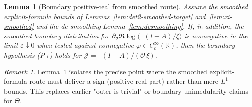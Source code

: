 \documentclass[11pt]{article}
\newtheorem{lemma}[theorem]{Lemma}
\theoremstyle{definition}
\theoremstyle{remark}
\newtheorem{remark}[theorem]{Remark}
\newcommand{\R}{\mathbb{R}}
\DeclareMathOperator{\dettwo}{det_2}
\begin{document}
\begin{lemma}[Boundary positive-real from smoothed route]\label{lem:boundary-posreal}
Assume the smoothed explicit-formula bounds of Lemmas~\ref{lem:det2-smoothed-target} and~\ref{lem:xi-smoothed} and the de-smoothing Lemma~\ref{lem:desmoothing}. If, in addition, the smoothed boundary distribution for \(\partial_\sigma\Re\log\big(\dettwo(I-A)/\xi\big)\) is nonnegative in the limit \(\varepsilon\downarrow 0\) when tested against nonnegative \(\varphi\in C_c^\infty(\R)\), then the boundary hypothesis \emph{(P+)} holds for \(\mathcal J=\dettwo(I-A)/(\mathcal O\,\xi)\).
\end{lemma}

\begin{remark}
Lemma~\ref{lem:boundary-posreal} isolates the precise point where the smoothed explicit-formula route must deliver a sign (positive real part) rather than mere $L^1$ bounds. This replaces earlier "outer is trivial" or boundary unimodularity claims for \(\Theta\).
\end{remark}
\end{document}

